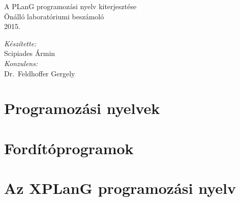 \documentclass[twoside,11pt,a4paper]{article}
\theoremstyle{plain}
\begin{document}
\begin{titlepage}
\newlength\drop
\setlength\drop{0.08\textheight}

\centering
\vspace*{2\drop}

{\huge A PLanG programozási nyelv kiterjesztése}\\[\baselineskip]
{Önálló laboratóriumi beszámoló}\\[\baselineskip]

\vspace*{0.5\drop}
\large 2015.

\vfill
\begin{flushright} \large
\emph{Készítette:}\\
Scipiades Ármin\\[\baselineskip]
\emph{Konzulens:} \\
Dr.~Feldhoffer Gergely
\end{flushright}
\vspace*{\drop}

\end{titlepage}
\cleardoublepage

\cleardoublepage
\thispagestyle{empty}
\tableofcontents

\newpage
\setcounter{page}{1}
\section{Programozási nyelvek}
\label{sec:proglang}


\newpage
\section{Fordítóprogramok}
\label{sec:fordprog}


\newpage
\section{Az XPLanG programozási nyelv}
\label{sec:xplang}



\newpage
\printbibliography
\end{document}

